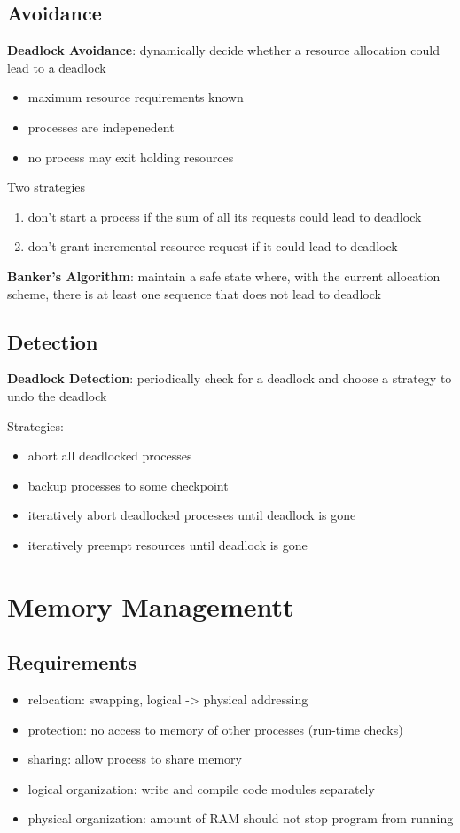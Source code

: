 \documentclass[]{article}
\theoremstyle{definition}
\begin{document}
	\subsection{Avoidance}
	\textbf{Deadlock Avoidance}: dynamically decide whether a resource allocation could lead to a deadlock
	\begin{itemize}
		\item maximum resource requirements known
		\item processes are indepenedent
		\item no process may exit holding resources
	\end{itemize}

	Two strategies
	\begin{enumerate}
		\item don't start a process if the sum of all its requests could lead to deadlock
		\item don't grant incremental resource request if it could lead to deadlock
	\end{enumerate}

	\textbf{Banker's Algorithm}: maintain a safe state where, with the current allocation scheme, 
	there is at least one sequence that does not lead to deadlock

	\subsection{Detection}
	\textbf{Deadlock Detection}: periodically check for a deadlock and choose a strategy to undo the deadlock

	Strategies:
	\begin{itemize}
		\item abort all deadlocked processes
		\item backup processes to some checkpoint 
		\item iteratively abort deadlocked processes until deadlock is gone
		\item iteratively preempt resources until deadlock is gone
	\end{itemize}

	\section{Memory Managementt}
	
	\subsection{Requirements}
	\begin{itemize}
		\item relocation: swapping, logical -> physical addressing
		\item protection: no access to memory of other processes (run-time checks)
		\item sharing: allow process to share memory
		\item logical organization: write and compile code modules separately
		\item physical organization: amount of RAM should not stop program from running
	\end{itemize}
\end{document}
